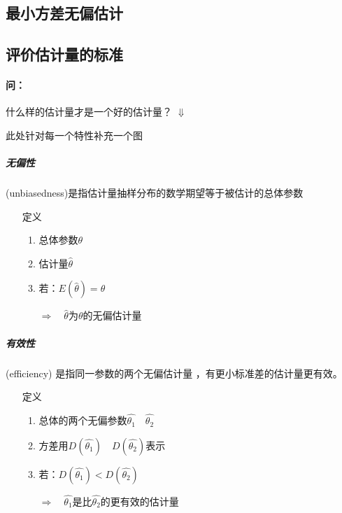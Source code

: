 \documentclass[UTF8,10pt]{book}
\begin{document}
        \subsection{最小方差无偏估计}

        \subsection{评价估计量的标准}

            \paragraph{问：} 什么样的估计量才是一个好的估计量？
            $\Downarrow$

                此处针对每一个特性补充一个图
                
                \subparagraph{无偏性}
                    (unbiasedness)是指估计量抽样分布的{\kaishu 数学期望}等于被估计的总体参数

                        \begin{itemize}
                            \item [定义]{
                            \begin{enumerate}
                                \item 总体参数$\theta$
                                \item 估计量$\hat{\theta}$
                                \item 若：$E(\hat{\theta}) = \theta$
                            
                                $\Rightarrow \quad \hat{\theta}$为$\theta$的无偏估计量
                            \end{enumerate}
                            }
                        \end{itemize}
                    


                \subparagraph{有效性}
                    (efficiency) 是指同一参数的两个{\kaishu 无偏估计量} ，有更小标准差的估计量更有效。

                        \begin{itemize}
                            
                            \item [定义]{
                            \begin{enumerate}
                                \item 总体的两个{\kaishu 无偏参数}$\hat{\theta_1} \quad \hat{\theta_2}$
                                \item 方差用$D(\hat{\theta_1}) \quad D(\hat{\theta_2})$表示
                                \item 若：$D(\hat{\theta_1}) < D(\hat{\theta_2})$
                            
                                $\Rightarrow \quad \hat{\theta_1}$是比$\hat{\theta_2}$的更有效的估计量
                            \end{enumerate}
                            }
                        \end{itemize}
\end{document}
